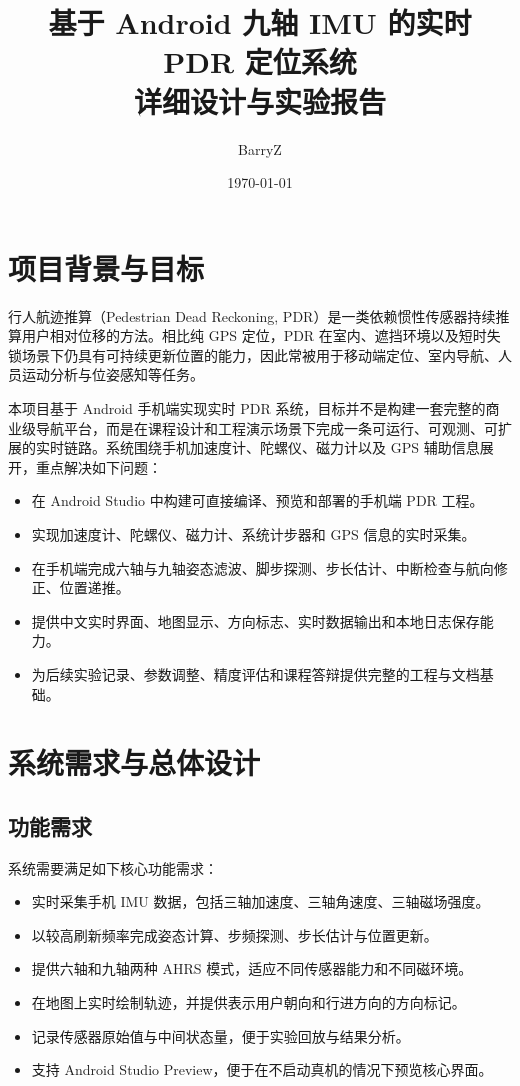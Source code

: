 \documentclass[12pt,a4paper]{ctexart}
\title{基于 Android 九轴 IMU 的实时 PDR 定位系统\\详细设计与实验报告}
\author{BarryZ}
\date{\today}
\begin{document}
\maketitle
\tableofcontents
\newpage

\section{项目背景与目标}
行人航迹推算（Pedestrian Dead Reckoning, PDR）是一类依赖惯性传感器持续推算用户相对位移的方法。相比纯 GPS 定位，PDR 在室内、遮挡环境以及短时失锁场景下仍具有可持续更新位置的能力，因此常被用于移动端定位、室内导航、人员运动分析与位姿感知等任务。

本项目基于 Android 手机端实现实时 PDR 系统，目标并不是构建一套完整的商业级导航平台，而是在课程设计和工程演示场景下完成一条可运行、可观测、可扩展的实时链路。系统围绕手机加速度计、陀螺仪、磁力计以及 GPS 辅助信息展开，重点解决如下问题：

\begin{itemize}
    \item 在 Android Studio 中构建可直接编译、预览和部署的手机端 PDR 工程。
    \item 实现加速度计、陀螺仪、磁力计、系统计步器和 GPS 信息的实时采集。
    \item 在手机端完成六轴与九轴姿态滤波、脚步探测、步长估计、中断检查与航向修正、位置递推。
    \item 提供中文实时界面、地图显示、方向标志、实时数据输出和本地日志保存能力。
    \item 为后续实验记录、参数调整、精度评估和课程答辩提供完整的工程与文档基础。
\end{itemize}

\section{系统需求与总体设计}
\subsection{功能需求}
系统需要满足如下核心功能需求：

\begin{itemize}
    \item 实时采集手机 IMU 数据，包括三轴加速度、三轴角速度、三轴磁场强度。
    \item 以较高刷新频率完成姿态计算、步频探测、步长估计与位置更新。
    \item 提供六轴和九轴两种 AHRS 模式，适应不同传感器能力和不同磁环境。
    \item 在地图上实时绘制轨迹，并提供表示用户朝向和行进方向的方向标记。
    \item 记录传感器原始值与中间状态量，便于实验回放与结果分析。
    \item 支持 Android Studio Preview，便于在不启动真机的情况下预览核心界面。
\end{itemize}
\end{document}
